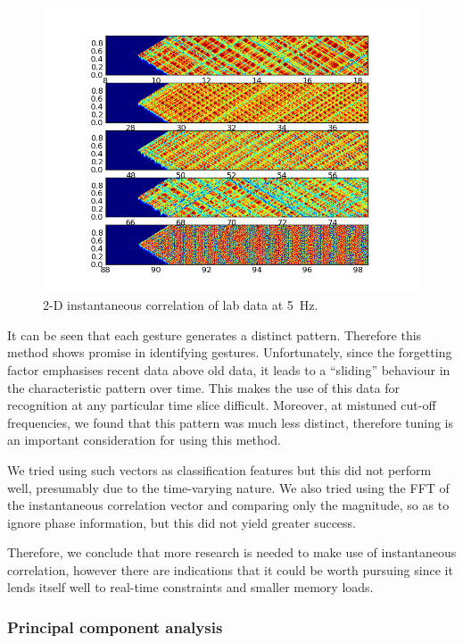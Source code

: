 \documentclass{article}
\begin{document}
\begin{figure}
\centerline{
  \includegraphics[width=4.5in]{instcor_5hz_200.png}}
  \caption{2-D instantaneous correlation of lab data at 5~Hz.}
\label{fig:instcor2d}
\end{figure}

It can be seen that each gesture generates a distinct pattern.
Therefore this method shows promise in identifying gestures.
Unfortunately, since the forgetting factor emphasises recent data
above old data, it leads to a ``sliding'' behaviour in the
characteristic pattern over time.
This makes the use of this data for recognition at any particular time
slice difficult.
Moreover, at mistuned cut-off frequencies, we found that this pattern
was much less distinct, therefore tuning is an important consideration
for using this method.

We tried using such vectors as classification features but this did
not perform well, presumably due to the time-varying nature.
We also tried using the FFT of the instantaneous correlation vector
and comparing only the magnitude, so as to ignore phase information,
but this did not yield greater success.

Therefore, we conclude that more research is needed to make use of
instantaneous correlation, however there are indications that it could
be worth pursuing since it lends itself well to real-time constraints
and smaller memory loads.

\subsubsection{Principal component analysis}\label{sec:pca}
\end{document}
